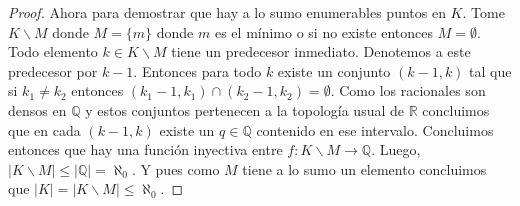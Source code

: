\documentclass[letter,twoside,12pt]{article}
\begin{document}
\begin{enumerate}
\begin{proof}
		Ahora para demostrar que hay a lo sumo enumerables puntos en $ K $. Tome $ K\backslash M $ donde $ M = \{m\}$ donde $ m $ es el mínimo o si no existe entonces $ M = \emptyset $. Todo elemento $ k \in K\backslash M $ tiene un predecesor inmediato. Denotemos a este predecesor por $ k-1 $. Entonces para todo $ k $ existe un conjunto $ (k-1,k) $ tal que si $ k_1 \not = k_2 $ entonces $ (k_1-1,k_1) \cap (k_2-1,k_2) = \emptyset $. Como los racionales son densos en $ \mathbb{Q} $ y estos conjuntos pertenecen a la topología usual de $ \mathbb{R} $ concluimos que en cada $ (k-1,k) $ existe un $ q \in \mathbb{Q} $ contenido en ese intervalo. Concluimos entonces que hay una función inyectiva entre $f: K\backslash M \to \mathbb{Q} $. Luego, $ |K\backslash M| \leq |\mathbb{Q}|= \aleph_0 $. Y pues como $ M $ tiene a lo sumo un elemento concluimos que $ |K|= |K\backslash M| \leq \aleph_0 $.
	\end{proof}
	
\end{enumerate}
\end{document}
